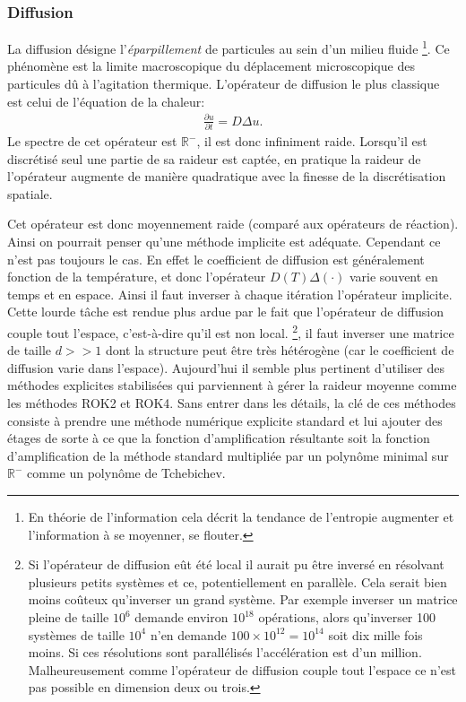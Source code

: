 \subsubsection{Diffusion}
    La diffusion désigne l'\textit{éparpillement} de particules au sein d'un milieu fluide
    \footnote{En théorie de l'information cela décrit la tendance de l'entropie augmenter et l'information à se moyenner, se flouter.}.
    Ce phénomène est la limite macroscopique du déplacement microscopique
    des particules dû à l'agitation thermique. L'opérateur de diffusion le plus classique est celui de l'équation de la chaleur:
    \begin{align} \frac{\partial u}{\partial t} = D \Delta u.\end{align}
    Le spectre de cet opérateur est $\mathbb R^-$, il est donc infiniment raide. Lorsqu'il est discrétisé seul une partie de sa raideur est captée,
    en pratique la raideur de l'opérateur augmente de manière quadratique avec la finesse de la discrétisation spatiale.\par
    Cet opérateur est donc moyennement raide (comparé aux opérateurs de réaction). Ainsi on pourrait penser qu'une méthode implicite est adéquate. Cependant ce n'est pas toujours le cas.
    En effet le coefficient de diffusion est généralement fonction de la température, et donc l’opérateur $D(T) \Delta(\cdot)$ varie souvent en temps et en espace. 
    Ainsi il faut inverser à chaque itération l'opérateur implicite. Cette lourde tâche est rendue plus ardue par le fait que l'opérateur de diffusion couple tout l'espace, c'est-à-dire qu'il est non local.
    \footnote{Si l'opérateur de diffusion eût été local il aurait pu être inversé en résolvant plusieurs petits systèmes et ce, potentiellement en parallèle.
    Cela serait bien moins coûteux qu'inverser un grand système. 
    Par exemple inverser un matrice pleine de taille $10^6$ demande environ $10^{18}$ opérations, alors qu'inverser 100 systèmes de taille $10^4$
    n'en demande $100 \times 10^{12} = 10^{14}$ soit dix mille fois moins. Si ces résolutions sont parallélisés l'accélération est d'un million. Malheureusement comme
    l'opérateur de diffusion couple tout l'espace ce n'est pas possible en dimension deux ou trois.},
    il faut inverser une matrice de taille $d >> 1$ dont la structure
    peut être très hétérogène (car le coefficient de diffusion varie dans l'espace). Aujourd'hui il semble plus pertinent
    d'utiliser des méthodes explicites stabilisées qui parviennent à gérer la raideur moyenne comme les méthodes 
    ROK2 et ROK4\cite{abdulle2002fourth}. Sans entrer dans les détails, la clé de ces méthodes consiste à prendre une méthode numérique explicite standard et lui ajouter des étages 
    de sorte à ce que la fonction d'amplification résultante soit la fonction d'amplification de la méthode standard multipliée par un polynôme minimal sur $\mathbb R^-$
    comme un polynôme de Tchebichev.

